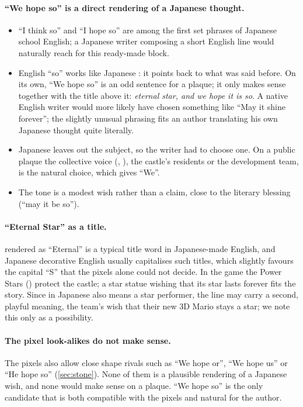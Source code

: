 \documentclass[10pt,a4paper]{article}
\newcommand{\q}[1]{``#1''}
\begin{document}
\paragraph{\q{We hope so} is a direct rendering of a Japanese thought.}
\begin{itemize}
\item \q{I think so} and \q{I hope so} are among the first set phrases of Japanese school English; a Japanese writer
composing a short English line would naturally reach for this ready-made block.
\item English \q{so} works like Japanese : it points back to what was said before. On its own, \q{We hope so}
is an odd sentence for a plaque; it only makes sense together with the title above it: \emph{eternal star, and we
hope it is so}. A native English writer would more likely have chosen something like \q{May it shine forever}; the
slightly unusual phrasing fits an author translating his own Japanese thought quite literally.
\item Japanese leaves out the subject, so the writer had to choose one. On a public plaque the collective voice
(, ), the castle's residents or the development team, is the natural choice, which gives
\q{We}.
\item The tone is a modest wish rather than a claim, close to the literary blessing  (\q{may it be
so}).
\end{itemize}

\paragraph{\q{Eternal Star} as a title.}
 rendered as \q{Eternal} is a typical title word in Japanese-made English, and Japanese decorative English
usually capitalises such titles, which slightly favours the capital \q{S} that the pixels alone could not decide. In
the game the Power Stars () protect the castle; a star statue wishing that its star lasts forever fits
the story. Since  in Japanese also means a star performer, the line may carry a second, playful meaning,
the team's wish that their new 3D Mario stays a star; we note this only as a possibility.

\paragraph{The pixel look-alikes do not make sense.}
The pixels also allow close shape rivals such as \q{We hope or}, \q{We hope us} or \q{He hope so}
(\cref{sec:stone}). None of them is a plausible rendering of a Japanese wish, and none would make sense on a plaque.
\q{We hope so} is the only candidate that is both compatible with the pixels and natural for the author.
\end{document}
